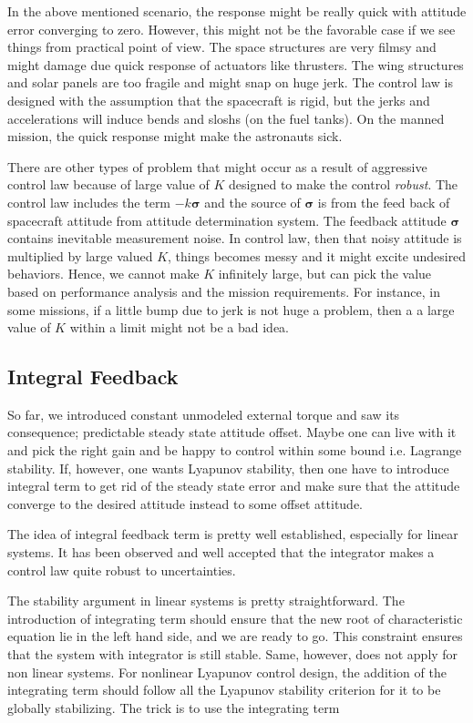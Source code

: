 \documentclass{article}
\begin{document}
In the above mentioned scenario, the response might be really quick with attitude error converging to zero. However, this might not be the favorable case if we see things from practical point of view. The space structures are very filmsy and might damage due quick response of actuators like thrusters. The wing structures and solar panels are too fragile and might snap on huge jerk. The control law is designed with the assumption that the spacecraft is rigid, but the jerks and accelerations will induce bends and sloshs (on the fuel tanks). On the manned mission, the quick response might make the astronauts sick.

There are other types of problem that might occur as a result of aggressive control law because of large value of $K$ designed to make the control \textit{robust}. The control law includes the term $-k\bm{\sigma}$ and the source  of $\bm{\sigma}$ is from the feed back of spacecraft attitude from attitude determination system. The feedback attitude $\bm{\sigma}$ contains inevitable measurement noise. In control law, then that noisy attitude is multiplied by large valued $K$, things becomes messy and it might excite undesired behaviors. Hence, we cannot make $K$ infinitely large, but can pick the value based on performance analysis and the mission requirements. For instance, in some missions, if a little bump due to jerk is not huge a problem, then a a large value of $K$ within a limit might not be a bad idea.


\subsection{Integral Feedback}

So far, we introduced constant unmodeled external torque and saw its consequence; predictable steady state attitude offset. Maybe one can live with it and pick the right gain and be happy to control within some bound i.e. Lagrange stability. If, however, one wants Lyapunov stability, then one have to introduce integral term to get rid of the steady state error and make sure that the attitude converge to the desired attitude instead to some offset attitude.

The idea of integral feedback term is pretty well established, especially for linear systems. It has been observed and well accepted that the integrator makes a control law quite robust to uncertainties.

The stability argument in linear systems is pretty straightforward. The introduction of integrating term should ensure that the new root of characteristic equation lie in the left hand side, and we are ready to go. This constraint ensures that the system with integrator is still stable. Same, however, does not apply for non linear systems. For nonlinear Lyapunov control design, the addition of the integrating term should follow all the Lyapunov stability criterion for it to be globally stabilizing. The trick is to use the integrating term 
\end{document}
